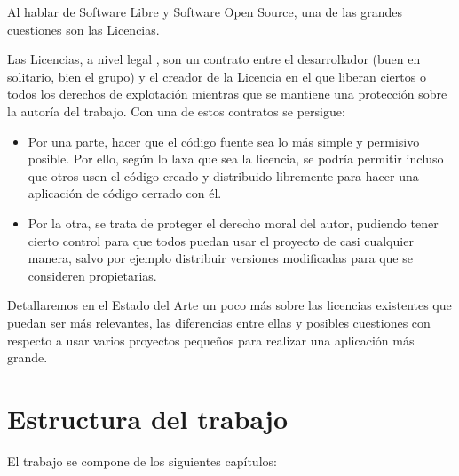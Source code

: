 Al hablar de Software Libre y Software Open Source, una de las grandes cuestiones son las Licencias. 

Las Licencias, a nivel legal\cite{fsfe-licensing} , son un contrato entre el desarrollador (buen en solitario, bien el grupo) y el creador de la Licencia en el que liberan ciertos o todos los derechos de explotación mientras que se mantiene una protección sobre la autoría del trabajo. Con una de estos contratos se persigue:
\begin{itemize}
	\item Por una parte, hacer que el código fuente sea lo más simple y permisivo posible. Por ello, según lo laxa que sea la licencia, se podría permitir incluso que otros usen el código creado y distribuido libremente para hacer una aplicación de código cerrado con él.
	\item Por la otra, se trata de proteger el derecho moral del autor, pudiendo tener cierto control para que todos puedan usar el proyecto de casi cualquier manera, salvo por ejemplo distribuir versiones modificadas para que se consideren propietarias.
\end{itemize}



Detallaremos en el Estado del Arte un poco más sobre las licencias existentes que puedan ser más relevantes, las diferencias entre ellas y posibles cuestiones con respecto a usar varios proyectos pequeños para realizar una aplicación más grande.

\section{Estructura del trabajo}

El trabajo se compone de los siguientes capítulos:

